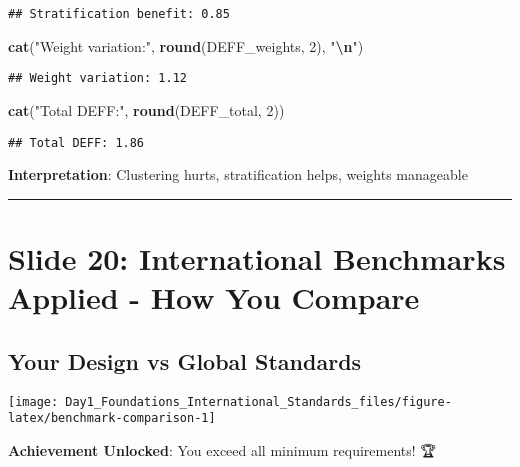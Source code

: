 \documentclass[
]{article}
\newenvironment{Shaded}{\begin{snugshade}}{\end{snugshade}}
\newcommand{\DecValTok}[1]{\textcolor[rgb]{0.00,0.00,0.81}{#1}}
\newcommand{\FunctionTok}[1]{\textcolor[rgb]{0.13,0.29,0.53}{\textbf{#1}}}
\newcommand{\NormalTok}[1]{#1}
\newcommand{\SpecialCharTok}[1]{\textcolor[rgb]{0.81,0.36,0.00}{\textbf{#1}}}
\newcommand{\StringTok}[1]{\textcolor[rgb]{0.31,0.60,0.02}{#1}}
\begin{document}
\begin{verbatim}
## Stratification benefit: 0.85
\end{verbatim}

\begin{Shaded}
\begin{Highlighting}[]
\FunctionTok{cat}\NormalTok{(}\StringTok{"Weight variation:"}\NormalTok{, }\FunctionTok{round}\NormalTok{(DEFF\_weights, }\DecValTok{2}\NormalTok{), }\StringTok{"}\SpecialCharTok{\textbackslash{}n}\StringTok{"}\NormalTok{)}
\end{Highlighting}
\end{Shaded}

\begin{verbatim}
## Weight variation: 1.12
\end{verbatim}

\begin{Shaded}
\begin{Highlighting}[]
\FunctionTok{cat}\NormalTok{(}\StringTok{"Total DEFF:"}\NormalTok{, }\FunctionTok{round}\NormalTok{(DEFF\_total, }\DecValTok{2}\NormalTok{))}
\end{Highlighting}
\end{Shaded}

\begin{verbatim}
## Total DEFF: 1.86
\end{verbatim}

\textbf{Interpretation}: Clustering hurts, stratification helps, weights
manageable

\begin{center}\rule{0.5\linewidth}{0.5pt}\end{center}

\section{Slide 20: International Benchmarks Applied - How You
Compare}\label{slide-20-international-benchmarks-applied---how-you-compare}

\subsection{Your Design vs Global
Standards}\label{your-design-vs-global-standards}

\texttt{[image: Day1\_Foundations\_International\_Standards\_files/figure-latex/benchmark-comparison-1]}

\textbf{Achievement Unlocked}: You exceed all minimum requirements! 🏆
\end{document}
